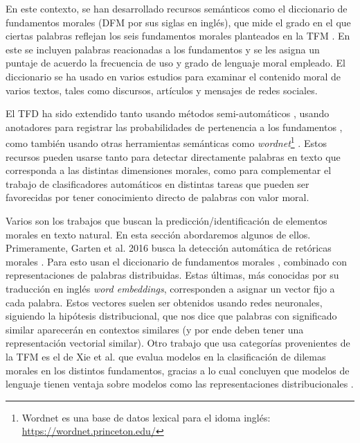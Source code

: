 \documentclass[
	spanish, %
	letterpaper, oneside
]{article}
\begin{document}
\newp En este contexto, se han desarrollado recursos semánticos como el diccionario de fundamentos morales (DFM por sus siglas en inglés), que mide el grado en el que ciertas palabras reflejan los seis fundamentos morales planteados en la TFM \cite{tfd}. En este se incluyen palabras reacionadas a los fundamentos y se les asigna un puntaje de acuerdo  la frecuencia de uso y grado de lenguaje moral empleado. El diccionario se ha usado en varios estudios para examinar el contenido moral de varios textos, tales como discursos, artículos y mensajes de redes sociales. 

\newp El TFD ha sido extendido tanto usando métodos semi-automáticos \cite{tfde}, usando anotadores para registrar las probabilidades de pertenencia a los fundamentos \cite{etfd}, como también usando otras herramientas semánticas como \textit{wordnet}\footnote{Wordnet es una base de datos lexical para el idoma inglés: \url{https://wordnet.princeton.edu/}} \cite{moral_strength}. Estos recursos pueden usarse tanto para detectar directamente palabras en texto que corresponda a las distintas dimensiones morales, como para complementar el trabajo de clasificadores automáticos en distintas tareas que pueden ser favorecidas por tener conocimiento directo de palabras con valor moral.



Varios son los trabajos que buscan la predicción/identificación de elementos morales en texto natural. En esta sección abordaremos algunos de ellos. Primeramente, Garten et al. 2016 busca la detección automática de retóricas morales \cite{garten}. Para esto usan el diccionario de fundamentos morales \cite{tfd}, combinado con representaciones de palabras distribuidas. Estas últimas, más conocidas por su traducción en inglés \textit{word embeddings}, corresponden a asignar un vector fijo a cada palabra. Estos vectores suelen ser obtenidos usando redes neuronales, siguiendo la hipótesis distribucional, que nos dice que palabras con significado similar aparecerán en contextos similares (y por ende deben tener una representación vectorial similar). Otro trabajo que usa categorías provenientes de la TFM es el de Xie et al. que evalua modelos en la clasificación de dilemas morales en los distintos fundamentos, gracias a lo cual concluyen que modelos de lenguaje tienen ventaja sobre modelos como las representaciones distribucionales \cite{xie}.
\end{document}
